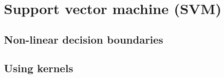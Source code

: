 \section{Support vector machine (SVM)}
\setcounter{figure}{0}



\subsection{Non-linear decision boundaries}
\subsection{Using kernels}